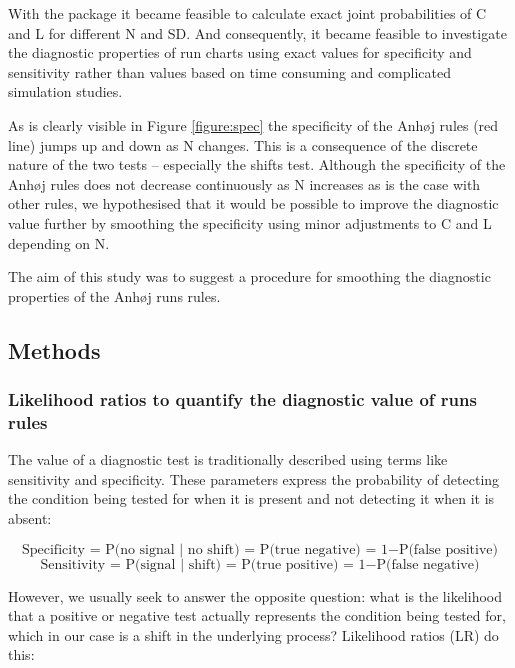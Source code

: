 With the  package it became feasible to calculate
exact joint probabilities of C and L for different N and SD. And
consequently, it became feasible to investigate the diagnostic
properties of run charts using exact values for specificity and
sensitivity rather than values based on time consuming and complicated
simulation studies.

As is clearly visible in Figure \ref{figure:spec} the specificity of the
Anhøj rules (red line) jumps up and down as N changes. This is a
consequence of the discrete nature of the two tests -- especially the
shifts test. Although the specificity of the Anhøj rules does not
decrease continuously as N increases as is the case with other rules, we
hypothesised that it would be possible to improve the diagnostic value
further by smoothing the specificity using minor adjustments to C and L
depending on N.

The aim of this study was to suggest a procedure for smoothing the
diagnostic properties of the Anhøj runs rules.

\hypertarget{methods}{%
\subsection{Methods}\label{methods}}

\hypertarget{likelihood-ratios-to-quantify-the-diagnostic-value-of-runs-rules}{%
\subsubsection{Likelihood ratios to quantify the diagnostic value of
runs
rules}\label{likelihood-ratios-to-quantify-the-diagnostic-value-of-runs-rules}}

The value of a diagnostic test is traditionally described using terms
like sensitivity and specificity. These parameters express the
probability of detecting the condition being tested for when it is
present and not detecting it when it is absent:

\[ \text{Specificity = P(no signal | no shift) = P(true negative) = 1} - \text{P(false positive)} \]
\[ \text{Sensitivity = P(signal | shift) = P(true positive) = 1} - \text{P(false negative)} \]

However, we usually seek to answer the opposite question: what is the
likelihood that a positive or negative test actually represents the
condition being tested for, which in our case is a shift in the
underlying process? Likelihood ratios (LR) do this:

